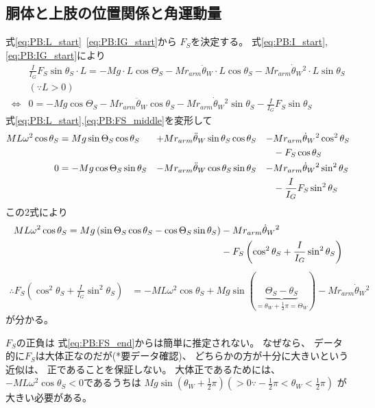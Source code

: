 \documentclass[a4paper,11pt]{jsarticle}
\begin{document}
\subsection{胴体と上肢の位置関係と角運動量}
式\ref{eq:PB:L_start}~\ref{eq:PB:IG_start}から
$F_S$を決定する。
式\ref{eq:PB:I_start},\ref{eq:PB:IG_start}により
\begin{align}
  & \frac{I}{I_G}F_S\sin\theta_S \cdot L 
  = -Mg \cdot L\cos\Theta_S
  - Mr_{arm}\ddot{\theta}_W \cdot L \cos\theta_S
  - Mr_{arm}\dot{\theta}_W{}^2 \cdot L \sin\theta_S
  \\
  & \left( \because L > 0 \right)
  \\
  \Leftrightarrow
  & 0
  = -Mg \cos\Theta_S
  - Mr_{arm}\ddot{\theta}_W \cos\theta_S
  - Mr_{arm}\dot{\theta}_W{}^2 \sin\theta_S
  - \frac{I}{I_G}F_S\sin\theta_S
  \label{eq:PB:FS_middle}
\end{align}
式\ref{eq:PB:L_start},\ref{eq:PB:FS_middle}を変形して
\begin{align*}
  ML\omega^2 \cos\theta_S
  &= Mg\sin\Theta_S \cos\theta_S
  &+& Mr_{arm}\ddot{\theta}_W\sin\theta_S  \cos\theta_S
  &-& Mr_{arm}\dot{\theta}_W{}^2\cos^2\theta_S 
  \notag
  \\
  &&&&& - F_S\cos\theta_S
  \\
  0 
  &= -Mg \cos\Theta_S \sin\theta_S
  &-& Mr_{arm}\ddot{\theta}_W \cos\theta_S \sin\theta_S
  &-& Mr_{arm}\dot{\theta}_W{}^2 \sin^2\theta_S
  \notag
  \\
  &&&&& - \frac{I}{I_G}F_S\sin^2\theta_S
\end{align*}
この2式により
\begin{align*}
  ML\omega^2 \cos\theta_S 
  = Mg\left( \sin\Theta_S \cos\theta_S - \cos\Theta_S \sin\theta_S\right)
  &- Mr_{arm}\dot{\theta}_W{}^2
  \notag
  \\
  &- F_S\left( \cos^2\theta_S + \frac{I}{I_G}\sin^2\theta_S \right)
\end{align*}
\begin{align}
  \therefore
  F_S\left( \cos^2\theta_S + \frac{I}{I_G}\sin^2\theta_S \right)
  &= -ML\omega^2 \cos\theta_S 
  + Mg \sin(\underbrace{\Theta_S - \theta_S}_{=\theta_W+\frac{1}{2}\pi=\Theta_W})
  - Mr_{arm}\dot{\theta}_W{}^2
  \label{eq:PB:FS_end}
\end{align}
が分かる。

$F_S$の正負は
式\ref{eq:PB:FS_end}からは簡単に推定されない。
なぜなら、
データ的に$F_S$は大体正なのだが(*要データ確認)、
どちらかの方が十分に大きいという近似は、
正であることを保証しない。
大体正であるためには、
$-ML\omega^2\cos\theta_S < 0$であるうちは
$Mg\sin(\theta_W + \frac{1}{2}\pi) ( > 0 \because -\frac{1}{2}\pi < \theta_W < \frac{1}{2}\pi )$
が大きい必要がある。
\end{document}
